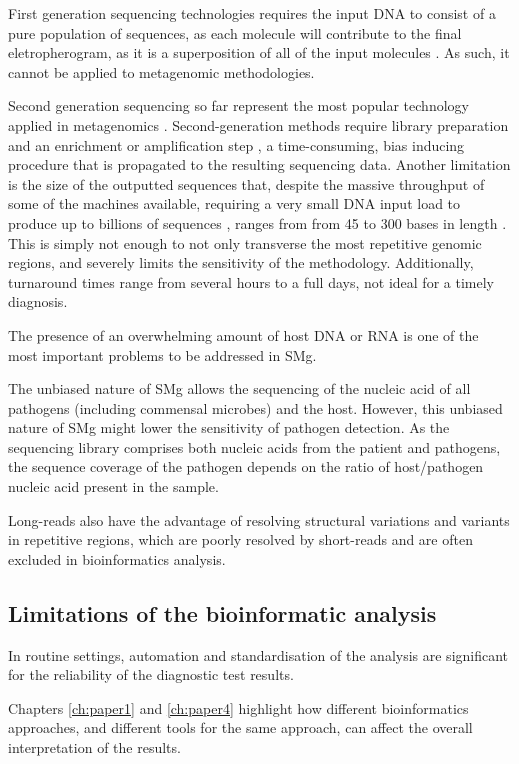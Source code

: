 First generation sequencing technologies requires the input \ac{DNA} to consist of a pure population of sequences, as each molecule will contribute to the final eletropherogram, as it is a superposition of all of the input molecules \citep{hagemann_overview_2015}. As such, it cannot be applied to metagenomic methodologies. 

Second generation sequencing so far represent the most popular technology applied in metagenomics \citep{rossen_practical_2018, loman_twenty_2015, loman_high-throughput_2012}. Second-generation methods require library preparation and an enrichment or amplification step \citep{hagemann_overview_2015}, a time-consuming, bias inducing procedure that is propagated to the resulting sequencing data. Another limitation is the size of the outputted sequences that, despite the massive throughput of some of the machines available, requiring a very small \ac{DNA} input load to produce up to billions of sequences \citep{loman_twenty_2015}, ranges from from 45 to 300 bases in length \citep{loman_performance_2012}. This is simply not enough to not only transverse the most repetitive genomic regions, and severely limits the sensitivity of the methodology. Additionally, turnaround times range from several hours to a full days, not ideal for a timely diagnosis.

The presence of an overwhelming amount of host \ac{DNA} or \ac{RNA} is one of the most important problems to be addressed in \ac{SMg}.

The unbiased nature of \ac{SMg} allows the sequencing of the nucleic acid of all pathogens (including commensal microbes) and the host. However, this unbiased nature of SMg might lower the sensitivity of pathogen detection. As the sequencing library comprises both nucleic acids from the patient and pathogens, the sequence coverage of the pathogen depends on the ratio of host/pathogen nucleic acid present in the sample. 

Long-reads also have the advantage of resolving structural variations and variants in repetitive regions, which are poorly resolved by short-reads and are often excluded in bioinformatics analysis. 

\subsection{Limitations of the bioinformatic analysis}

In routine settings, automation and standardisation of the analysis are significant for the reliability of the diagnostic test results. 

Chapters \ref{ch:paper1} and \ref{ch:paper4} highlight how different bioinformatics approaches, and different tools for the same approach, can affect the overall interpretation of the results. 